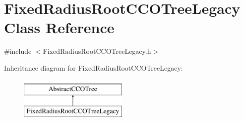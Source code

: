 \hypertarget{class_fixed_radius_root_c_c_o_tree_legacy}{}\section{Fixed\+Radius\+Root\+C\+C\+O\+Tree\+Legacy Class Reference}
\label{class_fixed_radius_root_c_c_o_tree_legacy}


{\ttfamily \#include $<$Fixed\+Radius\+Root\+C\+C\+O\+Tree\+Legacy.\+h$>$}

Inheritance diagram for Fixed\+Radius\+Root\+C\+C\+O\+Tree\+Legacy\+:\begin{figure}[H]
\begin{center}
\leavevmode
\includegraphics[height=2.000000cm]{dc/ddc/class_fixed_radius_root_c_c_o_tree_legacy}
\end{center}
\end{figure}
